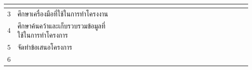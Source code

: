 \documentclass[12pt,oneside,openright,a4paper]{cpe-thai-project}
\begin{document}
\begin{table}[!ht]
{\begin{tabular}{|llllllllllllllllllllll|}
      \multicolumn{1}{l|}{} &
      \multicolumn{1}{l|}{} &
      \multicolumn{1}{l|}{} &
      \multicolumn{1}{l|}{} &
      \multicolumn{1}{l|}{} &
      \multicolumn{1}{l|}{} &
      \multicolumn{1}{l|}{} &
      \multicolumn{1}{l|}{} &
       \\ \hline
    \multicolumn{1}{|l|}{3} &
      \multicolumn{1}{l|}{ศึกษาเครื่องมือที่ใช้ในการทำโครงงาน} &
      \multicolumn{1}{l|}{} &
      \multicolumn{1}{l|}{} &
      \multicolumn{1}{l|}{\cellcolor[HTML]{FFCE93}} &
      \multicolumn{1}{l|}{\cellcolor[HTML]{FFCE93}} &
      \multicolumn{1}{l|}{} &
      \multicolumn{1}{l|}{} &
      \multicolumn{1}{l|}{} &
      \multicolumn{1}{l|}{} &
      \multicolumn{1}{l|}{} &
      \multicolumn{1}{l|}{} &
      \multicolumn{1}{l|}{} &
      \multicolumn{1}{l|}{} &
      \multicolumn{1}{l|}{} &
      \multicolumn{1}{l|}{} &
      \multicolumn{1}{l|}{} &
      \multicolumn{1}{l|}{} &
      \multicolumn{1}{l|}{} &
      \multicolumn{1}{l|}{} &
      \multicolumn{1}{l|}{} &
       \\ \hline
    \multicolumn{1}{|l|}{4} &
      \multicolumn{1}{l|}{ศึกษาค้นคว้าและเก็บรวบรวมข้อมูลที่ใช้ในการทำโครงการ} &
      \multicolumn{1}{l|}{} &
      \multicolumn{1}{l|}{} &
      \multicolumn{1}{l|}{\cellcolor[HTML]{FFCE93}} &
      \multicolumn{1}{l|}{\cellcolor[HTML]{FFCE93}} &
      \multicolumn{1}{l|}{} &
      \multicolumn{1}{l|}{} &
      \multicolumn{1}{l|}{} &
      \multicolumn{1}{l|}{} &
      \multicolumn{1}{l|}{} &
      \multicolumn{1}{l|}{} &
      \multicolumn{1}{l|}{} &
      \multicolumn{1}{l|}{} &
      \multicolumn{1}{l|}{} &
      \multicolumn{1}{l|}{} &
      \multicolumn{1}{l|}{} &
      \multicolumn{1}{l|}{} &
      \multicolumn{1}{l|}{} &
      \multicolumn{1}{l|}{} &
      \multicolumn{1}{l|}{} &
       \\ \hline
    \multicolumn{1}{|l|}{5} &
      \multicolumn{1}{l|}{จัดทำข้อเสนอโครงการ} &
      \multicolumn{1}{l|}{} &
      \multicolumn{1}{l|}{} &
      \multicolumn{1}{l|}{} &
      \multicolumn{1}{l|}{} &
      \multicolumn{1}{l|}{\cellcolor[HTML]{FFCE93}} &
      \multicolumn{1}{l|}{} &
      \multicolumn{1}{l|}{} &
      \multicolumn{1}{l|}{} &
      \multicolumn{1}{l|}{} &
      \multicolumn{1}{l|}{} &
      \multicolumn{1}{l|}{} &
      \multicolumn{1}{l|}{} &
      \multicolumn{1}{l|}{} &
      \multicolumn{1}{l|}{} &
      \multicolumn{1}{l|}{} &
      \multicolumn{1}{l|}{} &
      \multicolumn{1}{l|}{} &
      \multicolumn{1}{l|}{} &
      \multicolumn{1}{l|}{} &
       \\ \hline
    \multicolumn{1}{|l|}{6} &

\end{tabular}}
\end{table}
\end{document}
